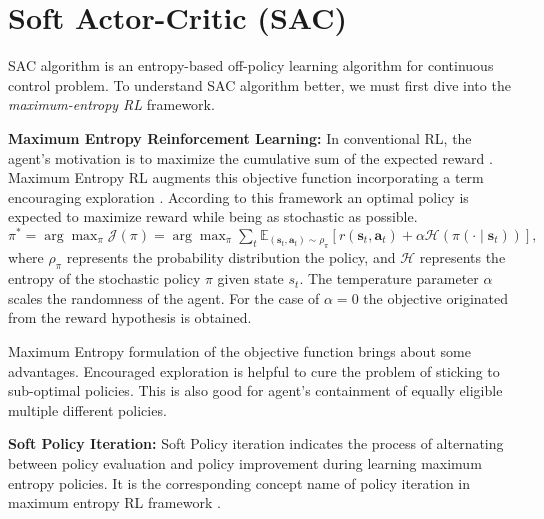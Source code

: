 \section{Soft Actor-Critic (SAC)}
 SAC algorithm is an entropy-based off-policy learning algorithm for continuous control problem. To understand SAC algorithm better, we must first dive into the \textit{maximum-entropy RL} framework.

\textbf{Maximum Entropy Reinforcement Learning:} In conventional RL, the agent's motivation is to maximize the cumulative sum of the expected reward \cite{Sutton1998}. Maximum Entropy RL augments this objective function incorporating a term encouraging exploration \cite{max_ent}. According to this framework an optimal policy is expected to maximize reward while being as stochastic as possible. $ \pi^*=\arg \max _\pi \mathcal{J}(\pi) =\arg \max _\pi \sum_t \mathbb{E}_{\left(\mathbf{s}_t, \mathbf{a}_t\right) \sim \rho_\pi}\left[r\left(\mathbf{s}_t, \mathbf{a}_t\right)+\alpha \mathcal{H}\left(\pi\left(\cdot \mid \mathbf{s}_t\right)\right)\right],$ where  $\rho_\pi$ represents the probability distribution the policy, and $\mathcal{H}$ represents the entropy of the stochastic policy $\pi$ given state $s_{t}$. The temperature parameter $\alpha$ scales the randomness of the agent. For the case of $\alpha=0$ the objective originated from the reward hypothesis is obtained. 

Maximum Entropy formulation of the objective function brings about some advantages. Encouraged exploration is helpful to cure the problem of sticking to sub-optimal policies. This is also good for agent's containment of equally eligible multiple different policies. 

\textbf{Soft Policy Iteration: } Soft Policy iteration indicates the process of alternating between policy evaluation and policy improvement during learning maximum entropy policies. It is the corresponding concept name of policy iteration in maximum entropy RL framework \cite{HaarnojaAbbeelLevine2018:SAC}.  

